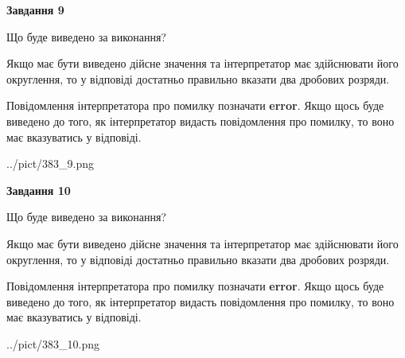 \documentclass[12pt, ukrainian]{article}
\begin{document}
{\begin {Large}
{\begin {center}\textbf{Завдання 9}\end {center}}\par
Що буде виведено за виконання? \par

Якщо має бути виведено дійсне значення та інтерпретатор має здійснювати його округлення, 
то у відповіді достатньо правильно вказати два дробових розряди.

Повідомлення інтерпретатора про помилку позначати \textbf{error}.
Якщо щось буде виведено до того, як інтерпретатор видасть повідомлення про помилку, 
то воно має вказуватись у відповіді. \par

\begin{center}
	{../pict/383_9.png}
\end{center}
\newpage

{\begin {center}\textbf{Завдання 10}\end {center}}\par
Що буде виведено за виконання? \par

Якщо має бути виведено дійсне значення та інтерпретатор має здійснювати його округлення, 
то у відповіді достатньо правильно вказати два дробових розряди.

Повідомлення інтерпретатора про помилку позначати \textbf{error}.
Якщо щось буде виведено до того, як інтерпретатор видасть повідомлення про помилку, 
то воно має вказуватись у відповіді. \par

\begin{center}
	{../pict/383_10.png}
\end{center}
\newpage

\end {Large}}
\end{document}
